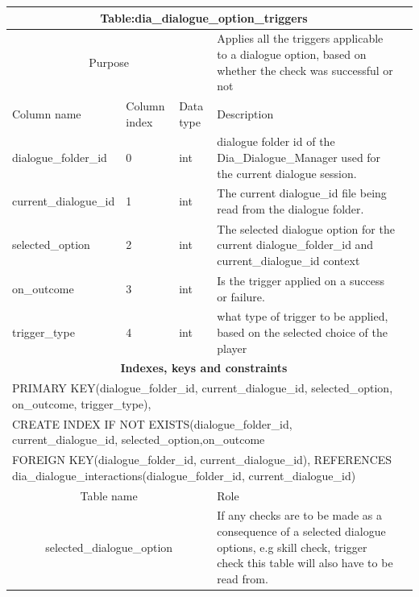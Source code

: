 \documentclass{report}
\begin{document}
\begin{table}[h]
\begin{tabular}{ |p{6cm}|p{1.2cm}|p{3cm}|p{3.6cm}|p{3.6cm}|  }
\hline
 \multicolumn{4}{|c|}{\textbf{Table:dia\_dialogue\_option\_triggers}} \\
  \hline
 \multicolumn{3}{|c|}{Purpose} & {Applies all the triggers applicable to a dialogue option, based on whether the check was successful or not} \\
 \hline
 Column name & Column index & Data type & Description \\
  \hline
 dialogue\_folder\_id & 0 & int & dialogue folder id of the Dia\_Dialogue\_Manager used for the current dialogue session.\\
 current\_dialogue\_id & 1 & int & The current dialogue\_id file being read from the dialogue folder.\\
 selected\_option & 2 & int & The selected dialogue option for the current dialogue\_folder\_id and current\_dialogue\_id context \\
 on\_outcome & 3 & int & Is the trigger applied on a success or failure. \\
 trigger\_type & 4 & int & what type of trigger to be applied, based on the selected choice of the player \\
 \hline
\multicolumn{4}{|c|}{\textbf{Indexes, keys and constraints}}  \\
\hline
   \multicolumn{4}{|p{5cm}|}{PRIMARY KEY(dialogue{\_}folder{\_}id, current{\_}dialogue{\_}id, selected\_option, on\_outcome, trigger\_type),} \\
      \multicolumn{4}{|p{5cm}|}{CREATE INDEX IF NOT EXISTS(dialogue{\_}folder{\_}id, current{\_}dialogue{\_}id, selected{\_option},on{\_outcome}} \\ 
   \hline
   \multicolumn{4}{|p{5cm}|}{FOREIGN KEY(dialogue{\_}folder{\_}id, current{\_}dialogue{\_}id), REFERENCES dia\_dialogue\_interactions(dialogue{\_}folder{\_}id, current{\_}dialogue{\_}id)} \\      
\multicolumn{3}{|c|}{Table name} & Role \\
\hline
\multicolumn{3}{|c|}{selected\_dialogue\_option} & If any checks are to be made as a consequence of a selected dialogue options, e.g skill check, trigger check this table will also have to be read from. \\
\hline
\end{tabular}
\end{table}
\end{document}
